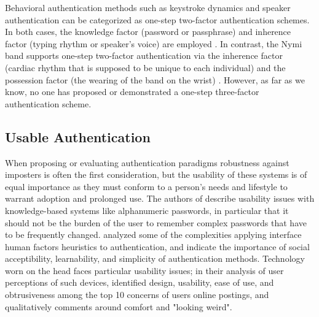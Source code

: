 \documentclass{sigchi}
\begin{document}

Behavioral authentication methods such as keystroke dynamics and speaker authentication can be categorized as one-step two-factor authentication schemes. In both cases, the knowledge factor (password or passphrase) and inherence factor (typing rhythm or speaker's voice) are employed \cite{Monrose1997}. In contrast, the Nymi band supports one-step two-factor authentication via the inherence factor (cardiac rhythm that is supposed to be unique to each individual) and the possession factor (the wearing of the band on the wrist) \cite{Nymi}. However, as far as we know, no one has proposed or demonstrated a one-step three-factor authentication scheme.%

\subsection{Usable Authentication}

When proposing or evaluating authentication paradigms robustness against imposters is often the first consideration, but the usability of these systems is of equal importance as they must conform to a person's needs and lifestyle to warrant adoption and prolonged use. The authors of \cite{sasse2001} describe usability issues with knowledge-based systems like alphanumeric passwords, in particular that it should not be the burden of the user to remember complex passwords that have to be frequently changed. \cite{braz2006} analyzed some of the complexities applying interface human factors heuristics to authentication, and indicate the importance of social acceptibility, learnability, and simplicity of authentication methods. Technology worn on the head faces particular usability issues; in their analysis of user perceptions of such devices, \cite{Genaro2014} identified design, usability, ease of use, and obtrusiveness among the top 10 concerns of users online postings, and qualitatively comments around comfort and "looking weird".
\end{document}
